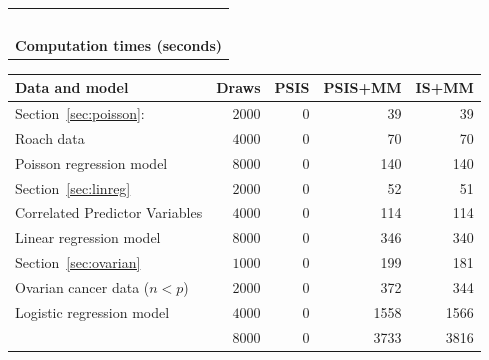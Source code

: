 \documentclass[12pt]{article}
\begin{document}
\begin{appendices}
\begin{table}[tb]
\begin{tabular}{ c }
\, \\
\textbf{Computation times (seconds)}  \\
\end{tabular}

\begin{tabular}{ l r r r r }
\toprule
Data and model & Draws & PSIS & PSIS+MM & IS+MM \\
\midrule
%
%

Section~\ref{sec:poisson}:         & $2000$  & 0 & 39 & 39  \\
Roach data                         & $4000$  & 0 & 70 & 70 \\
Poisson regression model           & $8000$  & 0 & 140 & 140 \\
\hline     

Section~\ref{sec:linreg}        & $2000$  & 0 & 52 & 51    \\
Correlated Predictor Variables                              & $4000$  &  0 & 114 & 114   \\
Linear regression model   & $8000$  & 0  & 346 & 340  \\
   
   \hline
   
Section~\ref{sec:ovarian} & $1000$  & 0 & 199 & 181  \\
Ovarian cancer data ($n < p$)             & $2000$  & 0 & 372 & 344  \\
Logistic regression model         & $4000$  & 0 & 1558 & 1566   \\
      & $8000$  & 0 & 3733 & 3816   \\
   
\bottomrule


\end{tabular}
\end{table}











\end{appendices}
\end{document}
